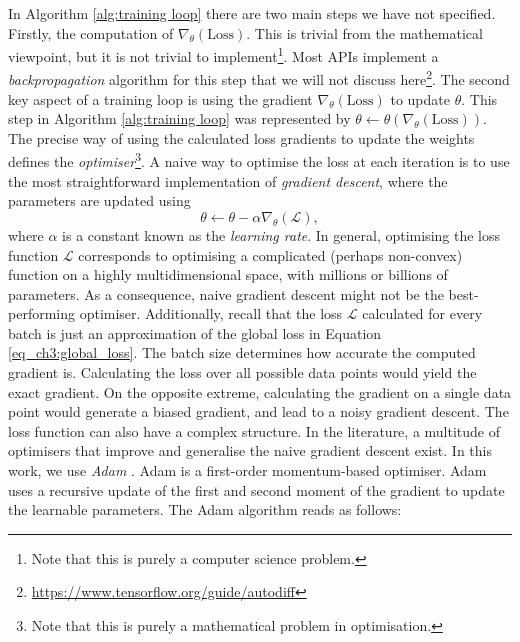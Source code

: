 In Algorithm \ref{alg:training loop} there are two main steps we have not specified. Firstly, the computation of $\nabla_\theta (\text{Loss})$. This is trivial from the mathematical viewpoint, but it is not trivial to implement\footnote{Note that this is purely a computer science problem.}. Most APIs implement a \emph{backpropagation} algorithm for this step that we will not discuss here\footnote{\url{https://www.tensorflow.org/guide/autodiff}}. The second key aspect of a training loop is using the gradient $\nabla_\theta (\text{Loss})$ to update $\theta$. This step in Algorithm \ref{alg:training loop} was represented by $\theta \gets \theta(\nabla_\theta (\text{Loss}))$. The precise way of using the calculated loss gradients to update the weights defines the \emph{optimiser}\footnote{Note that this is purely a mathematical problem in optimisation.}. A naive way to optimise the loss at each iteration is to use the most straightforward implementation of \emph{gradient descent}, where the parameters are updated using
\begin{equation}
    \theta \gets \theta - \alpha \nabla_\theta (\mathcal{L}),
\end{equation}
where $\alpha$ is a constant known as the \emph{learning rate}. In general, optimising the loss function $\mathcal{L}$ corresponds to optimising a complicated (perhaps non-convex) function on a highly multidimensional space, with millions or billions of parameters. As a consequence, naive gradient descent might not be the best-performing optimiser. Additionally, recall that the loss $\mathcal{L}$ calculated for every batch is just an approximation of the global loss in Equation \ref{eq_ch3:global_loss}. The batch size determines how accurate the computed gradient is. Calculating the loss over all possible data points would yield the exact gradient. On the opposite extreme, calculating the gradient on a single data point would generate a biased gradient, and lead to a noisy gradient descent. The loss function can also have a complex structure. In the literature, a multitude of optimisers that improve and generalise the naive gradient descent exist. In this work, we use \emph{Adam} \cite{adam}. Adam is a first-order momentum-based optimiser. Adam uses a recursive update of the first and second moment of the gradient to update the learnable parameters. The Adam algorithm reads as follows:

